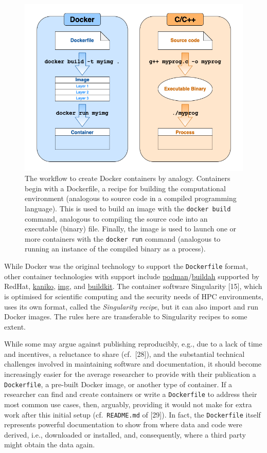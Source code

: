 \documentclass[10pt,letterpaper]{article}
\begin{document}
\begin{figure}[h]
\includegraphics[width=1\linewidth]{container-analogy} \caption{The workflow to create Docker containers by analogy. Containers begin with a Dockerfile, a recipe for building the computational environment (analogous to source code in a compiled programming language). This is used to build an image with the \texttt{docker build} command, analogous to compiling the source code into an executable (binary) file. Finally, the image is used to launch one or more containers with the \texttt{docker run} command (analogous to running an instance of the compiled binary as a process).}\label{fig:container-analogy}
\end{figure}

While Docker was the original technology to support the
\texttt{Dockerfile} format, other container technologies with support
include
\href{https://podman.io/}{podman}/\href{https://github.com/containers/buildah}{buildah}
supported by RedHat,
\href{https://github.com/GoogleContainerTools/kaniko}{kaniko},
\href{https://github.com/genuinetools/img}{img}, and
\href{https://github.com/moby/buildkit}{buildkit}. The container
software Singularity {[}15{]}, which is optimised for scientific
computing and the security needs of HPC environments, uses its own
format, called the \emph{Singularity recipe}, but it can also import and
run Docker images. The rules here are transferable to Singularity
recipes to some extent.

While some may argue against publishing reproducibly, e.g., due to a
lack of time and incentives, a reluctance to share (cf.~{[}28{]}), and
the substantial technical challenges involved in maintaining software
and documentation, it should become increasingly easier for the average
researcher to provide with their publication a \texttt{Dockerfile}, a
pre-built Docker image, or another type of container. If a researcher
can find and create containers or write a \texttt{Dockerfile} to address
their most common use cases, then, arguably, providing it would not make
for extra work after this initial setup (cf.~\texttt{README.md} of
{[}29{]}). In fact, the \texttt{Dockerfile} itself represents powerful
documentation to show from where data and code were derived, i.e.,
downloaded or installed, and, consequently, where a third party might
obtain the data again.
\end{document}
